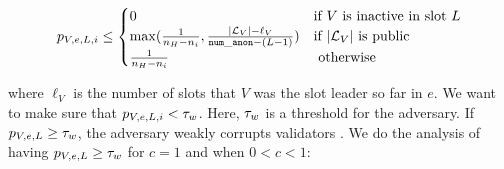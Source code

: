 \begin{equation*}
p_{V,e, L, i} \leq \begin{cases}
0 &\text{if } V \text{ is inactive in slot } L\\
\max(\frac{1}{n_H - n_i},\frac{|\mathcal{L}_V|- \ell_V}{\mathtt{num\_anon}-(L-1)})&\text{if } |\mathcal{L}_V| \text{ is public} \\
\frac{1}{n_H - n_i} & \text{ otherwise}
\end{cases}
\end{equation*}

where  $ \ell_V $ is the number of slots that $ V $ was the slot leader so far in $ e $. We want to make sure that $ p_{V,e,L,i} < \tau_w$. Here, $ \tau_w $ is a threshold for the adversary. If $ p_{V,e,L} \geq \tau_w $, the adversary weakly corrupts validators . We do the analysis of having $ p_{V,e,L} \geq \tau_w $ for $ c =1 $ and when $ 0 < c < 1 $:

